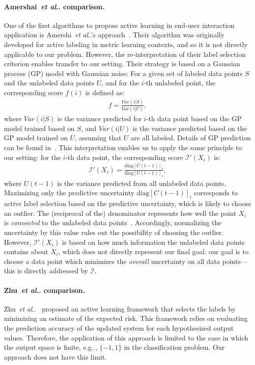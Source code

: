 \documentclass{article}
\makeatletter
\newcommand{\calI}{\mathcal{I}}
\DeclareRobustCommand\onedot{\futurelet\@let@token\@onedot}
\def\@onedot{\ifx\@let@token.\else.\null\fi\xspace}
\def\eg{{e.g}\onedot} \def\Eg{{E.g}\onedot}
\def\etal{\emph{et al}\onedot}
\makeatother
\begin{document}
\paragraph{Amershai~\etal comparison.}
One of the first algorithms to propose active learning in end-user interaction application is Amershi~\etal's approach~\cite{AmeFogKap11}. Their algorithm was originally developed for active labeling in metric learning contexts, and so it is not directly applicable to our problem. However, the re-interpretation of their label selection criterion enables transfer to our setting. Their strategy is based on a Gaussian process (GP) model with Gaussian noise: For a given set of labeled data points $S$ and the unlabeled data points $U$, and for the $i$-th unlabeled point, the corresponding score $f(i)$ is defined as:
\begin{align}
f=\frac{Var(i|S)}{Var(i|U)},
\end{align}
where $Var(i|S)$ is the variance predicted for $i$-th data point based on the GP model trained based on $S$, and $Var(i|U)$ is the variance predicted based on the GP model trained on $U$, assuming that $U$ are all labeled. Details of GP prediction can be found in~\cite{RasWill06}. This interpretation enables us to apply the same principle to our setting: for the $i$-th data point, the corresponding score $\calI'(X_i)$ is:
\begin{align}
\calI'(X_i) = \frac{\text{diag}[C(t-1)]_i}{\text{diag}[U(t-1)]_i},
\end{align}
where $U(t-1)$ is the variance predicted from all unlabeled data points. Maximizing only the predictive uncertainty $\text{diag}[C(t-1)]_i$ corresponds to active label selection based on the predictive uncertainty, which is likely to choose an outlier. The (reciprocal of the) denominator represents how well the point $X_i$ is \emph{connected} to the unlabeled data points~\cite{AmeFogKap11}. Accordingly, normalizing the uncertainty by this value rules out the possibility of choosing the outlier. However, $\calI'(X_i)$ is based on how much information the unlabeled data points contains about $X_i$, which does not directly represent our final goal: our goal is to choose a data point which minimizes the \emph{overall} uncertainty on all data points---this is directly addressed by $\calI$. 

\paragraph{Zhu~\etal comparison.}
Zhu~\etal~\cite{ZhuLafGha03} proposed an active learning framework that selects the labels by minimizing an estimate of the expected risk. This framework relies on evaluating the prediction accuracy of the updated system for each hypothesized output values. Therefore, the application of this approach is limited to the case in which the output space is finite, \eg, $\{-1,1\}$ in the classification problem. Our approach does not have this limit.
\end{document}
